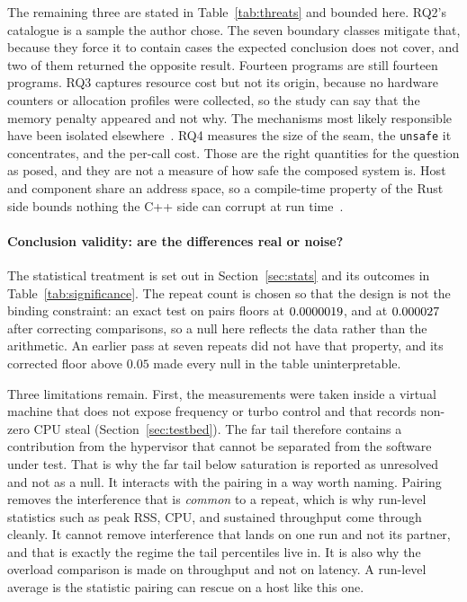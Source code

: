 \documentclass[english,oneside,a4paper,censored,csm,software-track-2020]{HYthesisML}
\begin{document}
The remaining three are stated in Table~\ref{tab:threats} and bounded here. RQ2's catalogue is a
sample the author chose. The seven boundary classes mitigate that, because they force it to
contain cases the expected conclusion does not cover, and two of them returned the opposite
result. Fourteen programs are still fourteen programs. RQ3 captures resource cost but not its origin, because no hardware
counters or allocation profiles were collected, so the study can say that the memory penalty
appeared and not why. The mechanisms most likely responsible have been isolated
elsewhere~\cite{zhang2022runtime,harris2023morello}. RQ4 measures the size of the seam, the
\texttt{unsafe} it concentrates, and the per-call cost. Those are the right quantities for the
question as posed, and they are not a measure of how safe the composed system is. Host and
component share an address space, so a compile-time property of the Rust side bounds nothing the
C++ side can corrupt at run time~\cite{rivera2021galeed,kirth2022pkrusafe}.

\paragraph{Conclusion validity: are the differences real or noise?}
The statistical treatment is set out in Section~\ref{sec:stats} and its outcomes in
Table~\ref{tab:significance}. The repeat count is chosen so that the design is not the binding
constraint: an exact test on \NRepeats{} pairs floors at $0.0000019$, and at
$0.000027$ after correcting \NTests{} comparisons, so a null here reflects the data rather
than the arithmetic. An earlier pass at seven repeats did not have that property, and its
corrected floor above $0.05$ made every null in the table uninterpretable.

Three limitations remain. First, the measurements were taken inside a virtual machine that does
not expose frequency or turbo control and that records non-zero CPU steal
(Section~\ref{sec:testbed}). The far tail therefore contains a contribution from the hypervisor
that cannot be separated from the software under test. That is why the far tail below saturation is
reported as unresolved and not as a null. It interacts with the pairing in a way worth naming.
Pairing removes the interference that is \emph{common} to a repeat, which is why run-level
statistics such as peak RSS, CPU, and sustained throughput come through cleanly. It cannot
remove interference that lands on one run and not its partner, and that is exactly the regime the
tail percentiles live in. It is also why the overload comparison is made on throughput and not
on latency. A run-level average is the statistic pairing can rescue on a host like this one.
\end{document}
